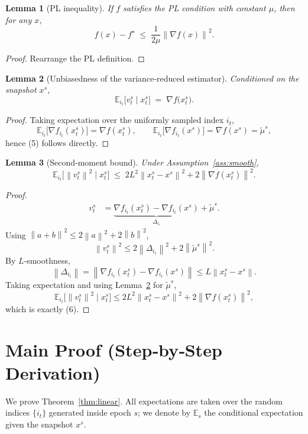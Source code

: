 \documentclass{article}
\newtheorem{lemma}{Lemma}[section]
\newcommand{\EE}{\mathbb{E}}
\newcommand{\grad}{\nabla}
\newcommand{\norm}[1]{\left\|#1\right\|}
\begin{document}
\begin{lemma}[PL inequality]\label{lem:pl}
If $f$ satisfies the PL condition with constant $\mu$, then for any $x$,
\[
f(x)-f^{\star}\;\le\;\frac{1}{2\mu}\norm{\grad f(x)}^{2}.
\tag{4}
\]
\end{lemma}
\begin{proof}
Rearrange the PL definition. \qedhere
\end{proof}

\begin{lemma}[Unbiasedness of the variance‑reduced estimator]\label{lem:unbiased}
Conditioned on the snapshot $x^{s}$,
\[
\EE_{i_t}\!\bigl[v_{t}^{s}\mid x_{t}^{s}\bigr] \;=\; \grad f\!\bigl(x_{t}^{s}\bigr).
\tag{5}
\]
\end{lemma}
\begin{proof}
Taking expectation over the uniformly sampled index $i_t$,
\[
\EE_{i_t}\!\bigl[\grad f_{i_t}(x_{t}^{s})\bigr]=\grad f(x_{t}^{s}),\qquad
\EE_{i_t}\!\bigl[\grad f_{i_t}(x^{s})\bigr]=\grad f(x^{s})=\tilde\mu^{s},
\]
hence (5) follows directly. \qedhere
\end{proof}

\begin{lemma}[Second‑moment bound]\label{lem:variance}
Under Assumption~\ref{ass:smooth},
\[
\EE_{i_t}\!\bigl[\norm{v_{t}^{s}}^{2}\mid x_{t}^{s}\bigr]
\;\le\;
2L^{2}\norm{x_{t}^{s}-x^{s}}^{2}+2\norm{\grad f(x_{t}^{s})}^{2}.
\tag{6}
\]
\end{lemma}
\begin{proof}
\[
\begin{aligned}
v_{t}^{s}
&=\underbrace{\grad f_{i_t}(x_{t}^{s})-\grad f_{i_t}(x^{s})}_{\Delta_{i_t}}
   +\tilde\mu^{s}.
\end{aligned}
\]
Using $\norm{a+b}^{2}\le 2\norm{a}^{2}+2\norm{b}^{2}$,
\[
\norm{v_{t}^{s}}^{2}
\le 2\norm{\Delta_{i_t}}^{2}+2\norm{\tilde\mu^{s}}^{2}.
\tag{7}
\]
By $L$‑smoothness,
\[
\norm{\Delta_{i_t}} = \norm{\grad f_{i_t}(x_{t}^{s})-\grad f_{i_t}(x^{s})}
\le L\norm{x_{t}^{s}-x^{s}}.
\]
Taking expectation and using Lemma~\ref{lem:unbiased} for $\tilde\mu^{s}$,
\[
\EE_{i_t}\!\bigl[\norm{v_{t}^{s}}^{2}\mid x_{t}^{s}\bigr]
\le 2L^{2}\norm{x_{t}^{s}-x^{s}}^{2}+2\norm{\grad f(x_{t}^{s})}^{2},
\]
which is exactly (6). \qedhere
\end{proof}

\newpage
\section*{Main Proof (Step‑by‑Step Derivation)}
We prove Theorem~\ref{thm:linear}.  All expectations are taken over the random
indices $\{i_t\}$ generated inside epoch $s$; we denote by $\EE_{s}$ the conditional
expectation given the snapshot $x^{s}$.
\end{document}
